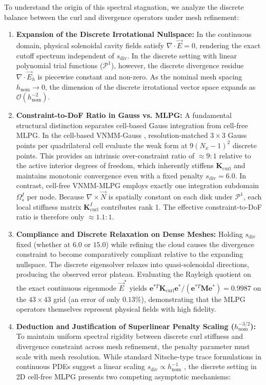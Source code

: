 \documentclass[preprint,12pt]{elsarticle}
\begin{document}
To understand the origin of this spectral stagnation, we analyze the discrete balance between the curl and divergence operators under mesh refinement:
\begin{enumerate}
    \item \textbf{Expansion of the Discrete Irrotational Nullspace:} In the continuous domain, physical solenoidal cavity fields satisfy $\nabla \cdot \vec{E} = 0$, rendering the exact cutoff spectrum independent of $s_{\mathrm{div}}$. In the discrete setting with linear polynomial trial functions ($\mathcal{P}^1$), however, the discrete divergence residue $\nabla \cdot \vec{E}_h$ is piecewise constant and non-zero. As the nominal mesh spacing $h_{\mathrm{nom}} \to 0$, the dimension of the discrete irrotational vector space expands as $\mathcal{O}(h_{\mathrm{nom}}^{-2})$.
    \item \textbf{Constraint-to-DoF Ratio in Gauss vs. MLPG:} A fundamental structural distinction separates cell-based Gauss integration from cell-free MLPG. In the cell-based VNMM-Gauss \cite{stable_vnmm2d_2026}, resolution-matched $3 \times 3$ Gauss points per quadrilateral cell evaluate the weak form at $9(N_x-1)^2$ discrete points. This provides an intrinsic over-constraint ratio of $\approx 9:1$ relative to the active interior degrees of freedom, which inherently stiffens $\mathbf{K}_{\mathrm{curl}}$ and maintains monotonic convergence even with a fixed penalty $s_{\mathrm{div}} = 6.0$. In contrast, cell-free VNMM-MLPG employs exactly one integration subdomain $\Omega_s^I$ per node. Because $\nabla \times \vec{N}$ is spatially constant on each disk under $\mathcal{P}^1$, each local stiffness matrix $\mathbf{K}_{\mathrm{curl}}^I$ contributes rank 1. The effective constraint-to-DoF ratio is therefore only $\approx 1.1:1$.
    \item \textbf{Compliance and Discrete Relaxation on Dense Meshes:} Holding $s_{\mathrm{div}}$ fixed (whether at $6.0$ or $15.0$) while refining the cloud causes the divergence constraint to become comparatively compliant relative to the expanding nullspace. The discrete eigensolver relaxes into quasi-solenoidal directions, producing the observed error plateau. Evaluating the Rayleigh quotient on the exact continuous eigenmode $\vec{E}^*$ yields $\mathbf{e}^{*T} \mathbf{K}_{\mathrm{curl}} \mathbf{e}^* / (\mathbf{e}^{*T} \mathbf{M} \mathbf{e}^*) = 0.9987$ on the $43 \times 43$ grid (an error of only $0.13\%$), demonstrating that the MLPG operators themselves represent physical fields with high fidelity.
    \item \textbf{Deduction and Justification of Superlinear Penalty Scaling ($h_{\mathrm{nom}}^{-3/2}$):} To maintain uniform spectral rigidity between discrete curl stiffness and divergence constraint across mesh refinement, the penalty parameter must scale with mesh resolution. While standard Nitsche-type trace formulations in continuous PDEs suggest a linear scaling $s_{\mathrm{div}} \propto h_{\mathrm{nom}}^{-1}$ \cite{nitsche1971uber, juntunen2009nitsche}, the discrete setting in 2D cell-free MLPG presents two competing asymptotic mechanisms:

\end{enumerate}
\end{document}
